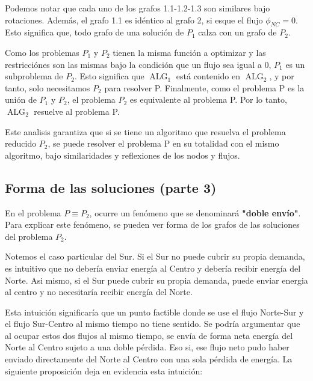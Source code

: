 \documentclass[12pt,twoside]{article}
\begin{document}
	\hspace{1cm} Podemos notar que cada uno de los grafos 1.1-1.2-1.3 son similares bajo rotaciones. Adem\'as, el grafo 1.1 es id\'entico al grafo 2, si esque el flujo \(\phi_{NC}=0\). Esto significa que, todo grafo de una soluci\'on de \(P_1\) calza con un grafo de \(P_2\).
	
	\hspace{1cm} Como los problemas \(P_1\) y \(P_2\) tienen la misma funci\'on a optimizar y las restricci\'ones son las mismas bajo la condici\'on que un flujo sea igual a 0, \(P_1\) es un subproblema de \(P_2\). Esto significa que \(\operatorname{ALG}_1\) est\'a contenido en \(\operatorname{ALG}_2\), y por tanto, solo necesitamos \(P_2\) para resolver P. Finalmente, como el problema P es la uni\'on de \(P_1\) y \(P_2\), el problema \(P_2\) es equivalente al problema P. Por lo tanto, \(\operatorname{ALG}_2\) resuelve al problema P. 
	
	\hspace{1cm} Este analisis garantiza que si se tiene un algoritmo que resuelva el problema reducido \(P_2\), se puede resolver el problema P en su totalidad con el mismo algoritmo, bajo similaridades y reflexiones de los nodos y flujos.
	
	\subsection{Forma de las soluciones (parte 3)}
	\hspace{1cm} En el problema \(P\equiv P_2\), ocurre un fen\'omeno que se denominar\'a \textbf{"doble env\'io"}. Para explicar este fen\'omeno, se pueden ver forma de los grafos de las soluciones del problema \(P_2\).
	
	\hspace{1cm} Notemos el caso particular del Sur. Si el Sur no puede cubrir su propia demanda, es intuitivo que no deber\'ia enviar energ\'ia al Centro y deber\'ia recibir energ\'ia del Norte. Asi mismo, si el Sur puede cubrir su propia demanda, puede enviar energia al centro y no necesitar\'ia recibir energ\'ia del Norte. 
	
	\hspace{1cm} Esta intuici\'on significar\'ia que un punto factible donde se use el flujo Norte-Sur y el flujo Sur-Centro al mismo tiempo no tiene sentido. Se podr\'ia argumentar que al ocupar estos dos flujos al mismo tiempo, se env\'ia de forma neta energ\'ia del Norte al Centro sujeto a una doble p\'erdida. Eso si, ese flujo neto pudo haber enviado directamente del Norte al Centro con una sola p\'erdida de energ\'ia. La siguiente proposici\'on deja en evidencia esta intuici\'on:
	\vspace{0.4cm}
	
\end{document}
